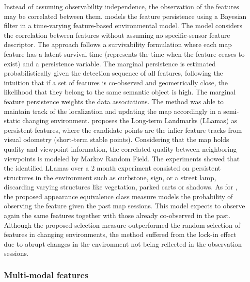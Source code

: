 Instead of assuming observability independence, the observation of the features may be correlated between them.
\cite{nobre-et-al:2018:8461111} models the feature persistence using a Bayesian filter in a time-varying feature-based environmental model. The model considers the correlation between features without assuming no specific-sensor feature descriptor. The approach follows a survivability formulation where each map feature has a latent survival-time (represents the time when the feature ceases to exist) and a persistence variable. The marginal persistence is estimated probabilistically given the detection sequence of all features, following the intuition that if a set of features is co-observed and geometrically close, the likelihood that they belong to the same semantic object is high. The marginal feature persistence weights the data associations. The method was able to maintain track of the localization and updating the map accordingly in a semi-static changing environment.
\cite{luthardt-et-al:2018:8569323} proposes the Long-term Landmarks (LLamas) as persistent features, where the candidate points are the inlier feature tracks from visual odometry (short-term stable points). Considering that the map holds quality and viewpoint information, the correlated quality between neighboring viewpoints is modeled by Markov Random Field. The experiments showed that the identified LLamas over a 2 month experiment consisted on persistent structures in the environment such as curbstone, sign, or a street lamp, discarding varying structures like vegetation, parked carts or shadows.
As for \cite{bürki-et-al:2019:21870}, the proposed appearance equivalence class measure models the probability of observing the feature given the past map sessions. This model expects to observe again the same features together with those already co-observed in the past.
Although the proposed selection measure outperformed the random selection of features in changing environments, the method suffered from the lock-in effect due to abrupt changes in the environment not being reflected in the observation sessions.



\subsubsection{Multi-modal features}

